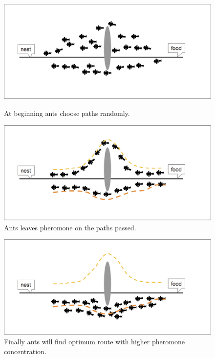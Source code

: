 \documentclass[senior]{IPSstyle}
\begin{document}
\begin{figure}[h]
  \centering
  \includegraphics[width=15cm]{MasterThesis-master/ACO-1.png}\\
  \caption{At beginning ants choose paths randomly.}\label{fig: aco1}
\end{figure}
\begin{figure}[h]
    \centering
    \includegraphics[width=15cm]{MasterThesis-master/ACO-2.png}
    \caption{Ants leaves pheromone on the paths passed.}
    \label{fig:my_label}
\end{figure}
\begin{figure}[h]
    \centering
    \includegraphics[width=15cm]{MasterThesis-master/ACO-3.png}
    \caption{Finally ants will find optimum route with higher pheromone concentration.}
    \label{fig:my_label}
\end{figure}
\end{document}
